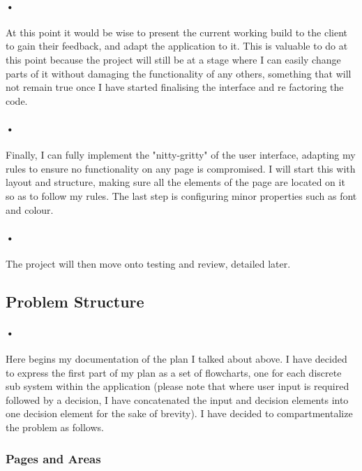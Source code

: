 ﻿\documentclass{article}
\begin{document}
    \paragraph{•}
    At this point it would be wise to present the current working build to the client to gain their feedback, and adapt the application to it.
    This is valuable to do at this point because the project will still be at a stage where I can easily change parts of it without damaging the functionality of any others, something that will not remain true once I have started finalising the interface and re factoring the code.
    \paragraph{•}
    Finally, I can fully implement the "nitty-gritty" of the user interface, adapting my rules to ensure no functionality on any page is compromised.
    I will start this with layout and structure, making sure all the elements of the page are located on it so as to follow my rules.
    The last step is configuring minor properties such as font and colour.
    \paragraph{•}
    The project will then move onto testing and review, detailed later.
    
    \subsection{Problem Structure}
    \paragraph{•}
    Here begins my documentation of the plan I talked about above.
    I have decided to express the first part of my plan as a set of flowcharts, one for each discrete sub system within the application (please note that where user input is required followed by a decision, I have concatenated the input and decision elements into one decision element for the sake of brevity).
    I have decided to compartmentalize the problem as follows.
    \subsubsection{Pages and Areas}
\end{document}
